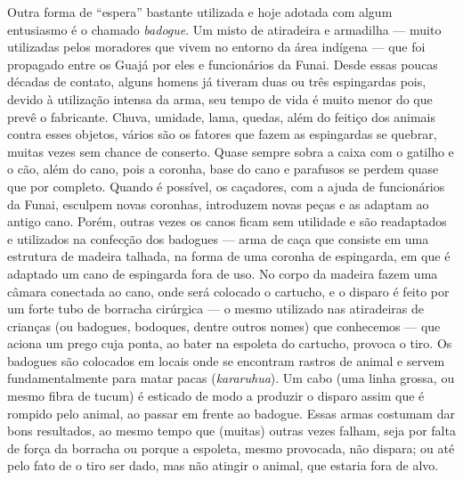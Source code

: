 Outra forma de ``espera'' bastante utilizada e hoje adotada com algum
entusiasmo é o chamado \emph{badogue}. Um misto de atiradeira e
armadilha --- muito utilizadas pelos moradores que vivem no entorno da
área indígena --- que foi propagado entre os Guajá por eles e funcionários
da Funai. Desde essas poucas décadas de contato, alguns homens já
tiveram duas ou três espingardas pois, devido à utilização intensa da
arma, seu tempo de vida é muito menor do que prevê o fabricante. Chuva,
umidade, lama, quedas, além do feitiço dos animais contra esses objetos,
vários são os fatores que fazem as espingardas se quebrar, muitas vezes
sem chance de conserto. Quase sempre sobra a caixa com o gatilho e o
cão, além do cano, pois a coronha, base do cano e parafusos se perdem
quase que por completo. Quando é possível, os caçadores, com a ajuda de
funcionários da Funai, esculpem novas coronhas, introduzem novas peças e
as adaptam ao antigo cano. Porém, outras vezes os canos ficam sem
utilidade e são readaptados e utilizados na confecção dos badogues ---
arma de caça que consiste em uma estrutura de madeira talhada, na forma
de uma coronha de espingarda, em que é adaptado um cano de espingarda
fora de uso. No corpo da madeira fazem uma câmara conectada ao cano,
onde será colocado o cartucho, e o disparo é feito por um forte tubo de
borracha cirúrgica --- o mesmo utilizado nas atiradeiras de crianças (ou
badogues, bodoques, dentre outros nomes) que conhecemos --- que aciona um
prego cuja ponta, ao bater na espoleta do cartucho, provoca o tiro. Os
badogues são colocados em locais onde se encontram rastros de animal e
servem fundamentalmente para matar pacas (\emph{kararuhua}). Um cabo
(uma linha grossa, ou mesmo fibra de tucum) é esticado de modo a
produzir o disparo assim que é rompido pelo animal, ao passar em frente
ao badogue. Essas armas costumam dar bons resultados, ao mesmo tempo que
(muitas) outras vezes falham, seja por falta de força da borracha ou
porque a espoleta, mesmo provocada, não dispara; ou até pelo fato de o
tiro ser dado, mas não atingir o animal, que estaria fora de alvo.

